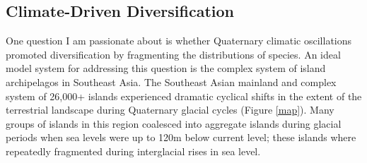 
\subsection*{Climate-Driven Diversification}
One question I am passionate about is whether Quaternary climatic oscillations
promoted diversification by fragmenting the distributions of species.
An ideal model system for addressing this question is the complex system of
island archipelagos in Southeast Asia.
The Southeast Asian mainland and complex system of 26,000+ islands experienced
dramatic cyclical shifts in the extent of the terrestrial landscape during
Quaternary glacial cycles (Figure \ref{map}).
Many groups of islands in this region coalesced into aggregate islands during
glacial periods when sea levels were up to 120m below current level; these
islands where repeatedly fragmented during interglacial rises in sea level.

